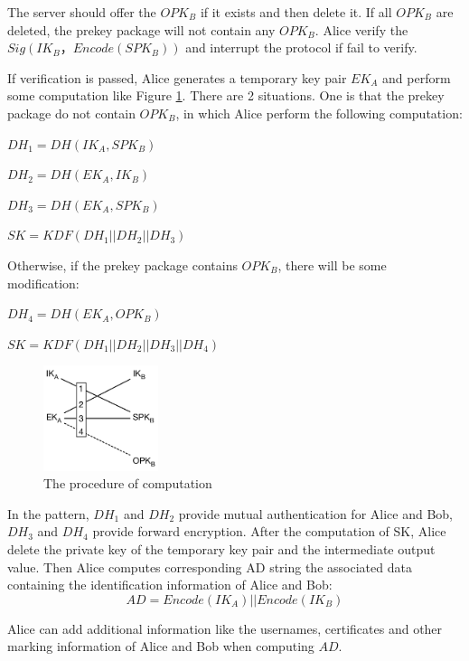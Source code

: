 \documentclass[11pt,en]{elegantpaper}
\begin{document}
The server should offer the $OPK_B$ if it exists and then delete it. If all $OPK_B$ are deleted, the prekey package will not contain any $OPK_B$. Alice verify the $Sig(IK_B，Encode(SPK_B))$ and interrupt the protocol if fail to verify.

If verification is passed, Alice generates a temporary key pair $EK_A$ and perform some computation like Figure \ref{x3dh1}. There are 2 situations. One is that the prekey package do not contain $OPK_B$, in which Alice perform the following computation:

\begin{center}
$DH_1=DH(IK_A,SPK_B)$

$DH_2=DH(EK_A,IK_B)$

$DH_3=DH(EK_A,SPK_B)$

$SK=KDF(DH_1||DH_2||DH_3)$
\end{center}


Otherwise, if the prekey package contains $OPK_B$, there will be some modification:
\begin{center}
    $DH_4=DH(EK_A,OPK_B)$
    
    $SK=KDF(DH_1||DH_2||DH_3||DH_4)$
\end{center}
    



\begin{figure}[H]
    \centering
    \includegraphics[width=0.3\textwidth]{image/X3DH}
    \caption{The procedure of computation}
    \label{x3dh1}
\end{figure}

In the pattern, $DH_1$ and $DH_2$ provide mutual authentication for Alice and Bob, $DH_3$ and $DH_4$ provide forward encryption. After the computation of SK, Alice delete the private key of the temporary key pair and the intermediate output value. Then Alice computes corresponding AD string the associated data containing the identification information of Alice and Bob:
$$AD=Encode(IK_A)||Encode(IK_B)$$


Alice can add additional information like the usernames, certificates and other marking information of Alice and Bob when computing $AD$.
\end{document}
